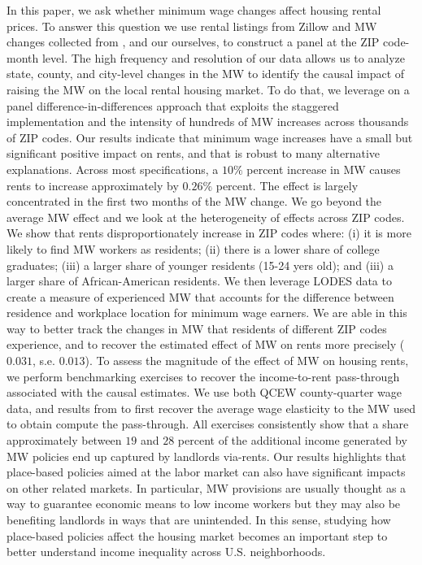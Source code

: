 
In this paper, we ask whether minimum wage changes affect housing rental prices. To answer this 
question we use rental listings from Zillow and MW changes collected from 
\textcite{VaghulZipperer2016}, \textcite{CegnizEtAl2019} and our ourselves, to construct a panel 
at the ZIP code-month level. The high frequency and resolution of our data allows us to analyze state, 
county, and city-level changes in the MW to identify the causal impact of raising the MW on the 
local rental housing market. To do that, we leverage on a panel difference-in-differences approach that 
exploits the staggered implementation and the intensity of hundreds of MW increases 
across thousands of ZIP codes. Our results indicate that minimum wage increases have a small but 
significant positive impact on rents, and that is robust to many alternative explanations. Across most 
specifications, a $10\%$ percent increase in MW causes rents to increase approximately by $0.26 \%$ percent. 
The effect is largely concentrated in the first two months of the MW change. We go 
beyond the average MW effect and we look at the heterogeneity of effects across ZIP codes. We show 
that rents disproportionately increase in ZIP codes where: (i) it is more likely to find MW workers as 
residents; (ii) there is a lower share of college graduates;  (iii) a larger share of younger residents (15-24 yers old);   
and (iii) a larger share of African-American 
residents. We then leverage LODES data to create a measure of experienced MW that accounts for the difference 
between residence and workplace location for minimum wage earners. We are able in this way to better track the 
changes in MW that residents of different ZIP codes experience, and to recover the estimated effect of MW on rents 
more precisely ($0.031$, s.e. $0.013$). To assess the magnitude of the effect of MW on housing rents, we perform 
benchmarking exercises to recover the income-to-rent pass-through associated with the causal estimates. 
We use both QCEW county-quarter wage data, and results from \textcite{CegnizEtAl2019} to first 
recover the average wage elasticity to the MW used to obtain compute the pass-through. All exercises 
consistently show that a share approximately between $19$ and $28$ percent of the additional income 
generated by MW policies end up captured by landlords via-rents.
Our results highlights that place-based policies aimed at the labor market can also have 
significant impacts on other related markets. In particular, MW provisions are usually thought as a 
way to guarantee economic means to low income workers but they may also be benefiting landlords in 
ways that are unintended. In this sense, studying how place-based policies affect the housing market 
becomes an important step to better understand income inequality across U.S. neighborhoods.

